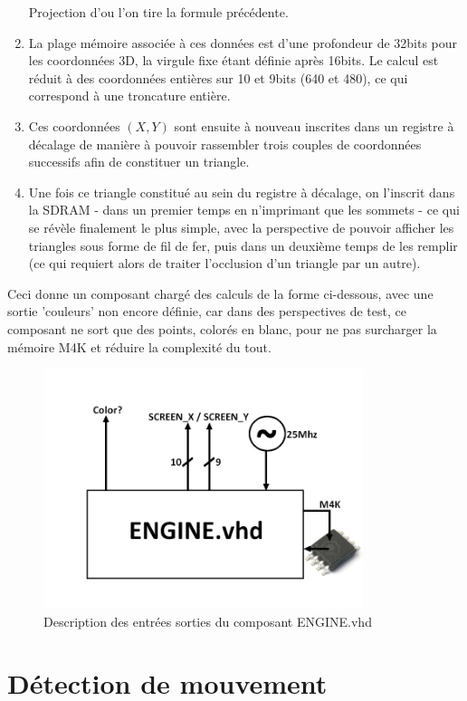 \documentclass[10pt,a4paper]{report}
\begin{document}
\begin{enumerate}
Projection d'ou l'on tire la formule précédente.

\item La plage mémoire associée à ces données est d'une profondeur de 32bits pour les coordonnées 3D, la virgule fixe étant définie après 16bits. Le calcul est réduit à des coordonnées entières sur 10 et 9bits (640 et 480), ce qui correspond à une troncature entière.

\item Ces coordonnées $\left(X,Y\right)$ sont ensuite à nouveau inscrites dans un registre à décalage de manière à pouvoir rassembler trois couples de coordonnées successifs afin de constituer un triangle.

\item Une fois ce triangle constitué au sein du registre à décalage, on l'inscrit dans la SDRAM - dans un premier temps en n'imprimant que les sommets - ce qui se révèle finalement le plus simple, avec la perspective de pouvoir afficher les triangles sous forme de fil de fer, puis dans un deuxième temps de les remplir (ce qui requiert alors de traiter l'occlusion d'un triangle par un autre).

\end{enumerate}

Ceci donne un composant chargé des calculs de la forme ci-dessous, avec une sortie 'couleurs' non encore définie, car dans des perspectives de test, ce composant ne sort que des points, colorés en blanc, pour ne pas surcharger la mémoire M4K et réduire la complexité du tout.
\begin{figure}[!h]
\centering
\includegraphics[width=265pt]{gfx/engine.png}
\caption{Description des entrées sorties du composant ENGINE.vhd}
\end{figure}

\section{Détection de mouvement}
\end{document}
